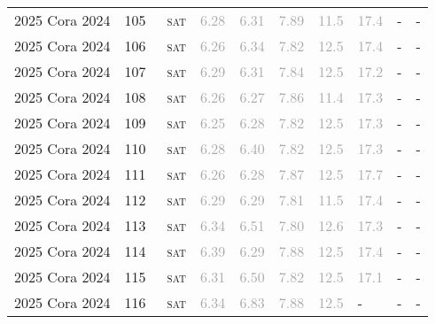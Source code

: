 \begin{center}
{\begin{longtable}{@{}llllllllll@{}}
2025 Cora 2024 & 105 & ~\textsc{sat} & \textcolor{darkgray}{6.28} & \textcolor{darkgray}{6.31} & \textcolor{darkgray}{7.89} & \textcolor{darkgray}{11.5} & \textcolor{darkgray}{17.4} & - & - \\
2025 Cora 2024 & 106 & ~\textsc{sat} & \textcolor{darkgray}{6.26} & \textcolor{darkgray}{6.34} & \textcolor{darkgray}{7.82} & \textcolor{darkgray}{12.5} & \textcolor{darkgray}{17.4} & - & - \\
2025 Cora 2024 & 107 & ~\textsc{sat} & \textcolor{darkgray}{6.29} & \textcolor{darkgray}{6.31} & \textcolor{darkgray}{7.84} & \textcolor{darkgray}{12.5} & \textcolor{darkgray}{17.2} & - & - \\
2025 Cora 2024 & 108 & ~\textsc{sat} & \textcolor{darkgray}{6.26} & \textcolor{darkgray}{6.27} & \textcolor{darkgray}{7.86} & \textcolor{darkgray}{11.4} & \textcolor{darkgray}{17.3} & - & - \\
2025 Cora 2024 & 109 & ~\textsc{sat} & \textcolor{darkgray}{6.25} & \textcolor{darkgray}{6.28} & \textcolor{darkgray}{7.82} & \textcolor{darkgray}{12.5} & \textcolor{darkgray}{17.3} & - & - \\
2025 Cora 2024 & 110 & ~\textsc{sat} & \textcolor{darkgray}{6.28} & \textcolor{darkgray}{6.40} & \textcolor{darkgray}{7.82} & \textcolor{darkgray}{12.5} & \textcolor{darkgray}{17.3} & - & - \\
2025 Cora 2024 & 111 & ~\textsc{sat} & \textcolor{darkgray}{6.26} & \textcolor{darkgray}{6.28} & \textcolor{darkgray}{7.87} & \textcolor{darkgray}{12.5} & \textcolor{darkgray}{17.7} & - & - \\
2025 Cora 2024 & 112 & ~\textsc{sat} & \textcolor{darkgray}{6.29} & \textcolor{darkgray}{6.29} & \textcolor{darkgray}{7.81} & \textcolor{darkgray}{11.5} & \textcolor{darkgray}{17.4} & - & - \\
2025 Cora 2024 & 113 & ~\textsc{sat} & \textcolor{darkgray}{6.34} & \textcolor{darkgray}{6.51} & \textcolor{darkgray}{7.80} & \textcolor{darkgray}{12.6} & \textcolor{darkgray}{17.3} & - & - \\
2025 Cora 2024 & 114 & ~\textsc{sat} & \textcolor{darkgray}{6.39} & \textcolor{darkgray}{6.29} & \textcolor{darkgray}{7.88} & \textcolor{darkgray}{12.5} & \textcolor{darkgray}{17.4} & - & - \\
2025 Cora 2024 & 115 & ~\textsc{sat} & \textcolor{darkgray}{6.31} & \textcolor{darkgray}{6.50} & \textcolor{darkgray}{7.82} & \textcolor{darkgray}{12.5} & \textcolor{darkgray}{17.1} & - & - \\
2025 Cora 2024 & 116 & ~\textsc{sat} & \textcolor{darkgray}{6.34} & \textcolor{darkgray}{6.83} & \textcolor{darkgray}{7.88} & \textcolor{darkgray}{12.5} & - & - & - \\

\end{longtable}}
\end{center}
